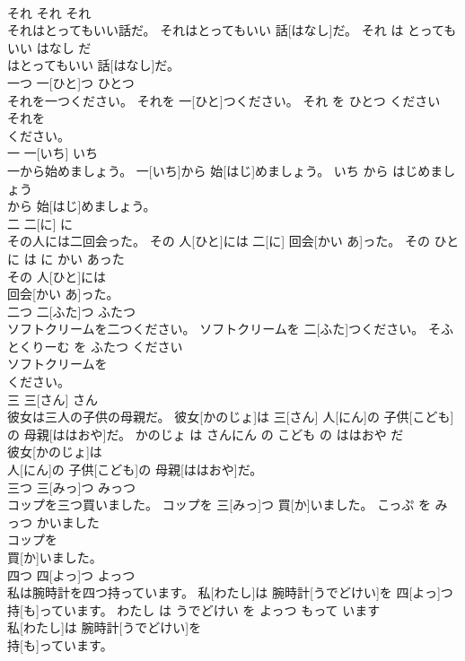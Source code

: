 \documentclass[8pt]{extreport}
\begin{document}
\begin{CJK}{UTF8}{min}
\\	それ	それ	それ	
\\	それはとってもいい話だ。	それはとってもいい 話[はなし]だ。	それ は とっても いい はなし だ	
\\	はとってもいい 話[はなし]だ。			
\\	一つ	一[ひと]つ	ひとつ	
\\	それを一つください。	それを 一[ひと]つください。	それ を ひとつ ください	
\\	それを
\\	ください。			
\\	一	一[いち]	いち	
\\	一から始めましょう。	一[いち]から 始[はじ]めましょう。	いち から はじめましょう	
\\	から 始[はじ]めましょう。			
\\	二	二[に]	に	
\\	その人には二回会った。	その 人[ひと]には 二[に] 回会[かい あ]った。	その ひと に は に かい あった	
\\	その 人[ひと]には
\\	回会[かい あ]った。			
\\	二つ	二[ふた]つ	ふたつ	
\\	ソフトクリームを二つください。	ソフトクリームを 二[ふた]つください。	そふとくりーむ を ふたつ ください	
\\	ソフトクリームを
\\	ください。			
\\	三	三[さん]	さん	
\\	彼女は三人の子供の母親だ。	彼女[かのじょ]は 三[さん] 人[にん]の 子供[こども]の 母親[ははおや]だ。	かのじょ は さんにん の こども の ははおや だ	
\\	彼女[かのじょ]は
\\	人[にん]の 子供[こども]の 母親[ははおや]だ。			
\\	三つ	三[みっ]つ	みっつ	
\\	コップを三つ買いました。	コップを 三[みっ]つ 買[か]いました。	こっぷ を みっつ かいました	
\\	コップを
\\	買[か]いました。			
\\	四つ	四[よっ]つ	よっつ	
\\	私は腕時計を四つ持っています。	私[わたし]は 腕時計[うでどけい]を 四[よっ]つ 持[も]っています。	わたし は うでどけい を よっつ もって います	
\\	私[わたし]は 腕時計[うでどけい]を
\\	持[も]っています。			

\end{CJK}
\end{document}
